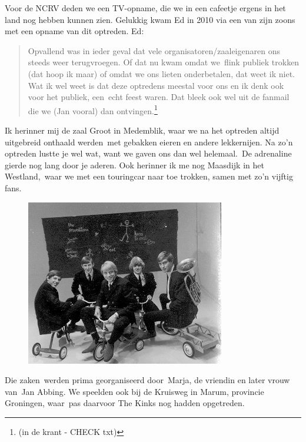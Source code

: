 \documentclass[12pt,twoside, openright]{memoir}
\begin{document}
Voor de NCRV deden we een TV-opname, die we in een cafeetje ergens in het land nog hebben kunnen zien. Gelukkig kwam Ed in 2010 via een van zijn zoons met een opname van dit optreden. Ed: 

\begin{quote}
Opvallend was in ieder geval dat vele organisatoren/zaaleigenaren ons steeds weer terugvroegen. Of dat nu kwam omdat we flink publiek trokken (dat hoop ik maar) of omdat we ons lieten onderbetalen, dat weet ik niet. Wat ik wel weet is dat deze optredens meestal voor ons en ik denk ook voor het publiek, een echt feest waren. Dat bleek ook wel uit de fanmail die we (Jan vooral) dan ontvingen.\footnote{(in de krant - CHECK txt)}
\end{quote}

Ik herinner mij de zaal Groot in Medemblik, waar we na het optreden altijd uitgebreid onthaald werden met gebakken eieren en andere lekkernijen. Na zo'n optreden lustte je wel wat, want we gaven ons dan wel helemaal. De adrenaline gierde nog lang door je aderen. Ook herinner ik me nog Maasdijk in het Westland, waar we met een touringcar naar toe trokken, samen met zo'n vijftig fans. 

\begin{figure}
\includegraphics[width=\textwidth]{img/ch27/hartland}
\end{figure}

Die zaken werden prima georganiseerd door Marja, de vriendin en later vrouw van Jan Abbing. We speelden ook bij de Kruisweg in Marum, provincie Groningen, waar pas daarvoor The Kinks nog hadden opgetreden.
\end{document}
